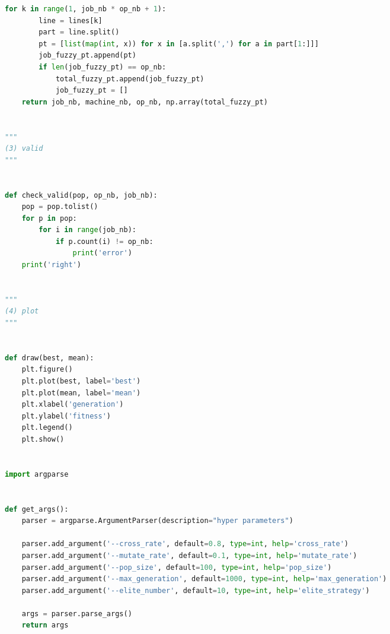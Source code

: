 \documentclass{whutmod}
\begin{document}
\begin{spacing}{1.2}
\begin{lstlisting}[language=python]
    for k in range(1, job_nb * op_nb + 1):
        line = lines[k]
        part = line.split()
        pt = [list(map(int, x)) for x in [a.split(',') for a in part[1:]]]
        job_fuzzy_pt.append(pt)
        if len(job_fuzzy_pt) == op_nb:
            total_fuzzy_pt.append(job_fuzzy_pt)
            job_fuzzy_pt = []
    return job_nb, machine_nb, op_nb, np.array(total_fuzzy_pt)


"""
(3) valid
"""


def check_valid(pop, op_nb, job_nb):
    pop = pop.tolist()
    for p in pop:
        for i in range(job_nb):
            if p.count(i) != op_nb:
                print('error')
    print('right')


"""
(4) plot
"""


def draw(best, mean):
    plt.figure()
    plt.plot(best, label='best')
    plt.plot(mean, label='mean')
    plt.xlabel('generation')
    plt.ylabel('fitness')
    plt.legend()
    plt.show()


import argparse


def get_args():
    parser = argparse.ArgumentParser(description="hyper parameters")

    parser.add_argument('--cross_rate', default=0.8, type=int, help='cross_rate')
    parser.add_argument('--mutate_rate', default=0.1, type=int, help='mutate_rate')
    parser.add_argument('--pop_size', default=100, type=int, help='pop_size')
    parser.add_argument('--max_generation', default=1000, type=int, help='max_generation')
    parser.add_argument('--elite_number', default=10, type=int, help='elite_strategy')

    args = parser.parse_args()
    return args

\end{lstlisting}



 
\end{spacing}
\end{document}
